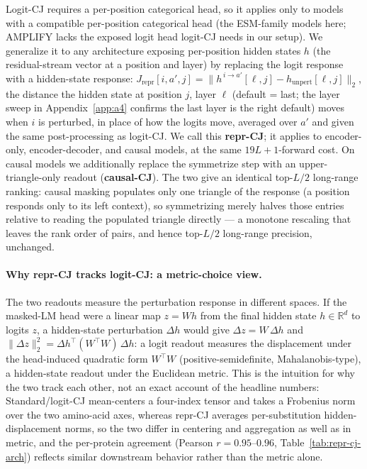 \documentclass{article}
\begin{document}
Logit-CJ requires a per-position categorical head, so it applies only
to models with a compatible per-position categorical head (the ESM-family
models here; AMPLIFY lacks the exposed logit head logit-CJ needs in our
setup). We generalize
it to any architecture exposing per-position hidden states $h$ (the
residual-stream vector at a position and layer) by replacing the logit
response with a hidden-state response:
$J_{\mathrm{repr}}[i, a', j] = \| h^{\,i\to a'}[\ell, j] - h_{\mathrm{unpert}}[\ell, j] \|_2$,
the distance the hidden state at position $j$, layer $\ell$
(default = last; the layer sweep in Appendix~\ref{app:a4} confirms the
last layer is the right default) moves when $i$ is perturbed, in place of
how the logits move, averaged over $a'$ and given the same post-processing
as logit-CJ. We call this \textbf{repr-CJ}; it
applies to encoder-only, encoder-decoder, and causal models, at the
same $19L+1$-forward cost. On causal models we additionally replace
the symmetrize step with an upper-triangle-only readout
(\textbf{causal-CJ}). The two give an identical top-$L/2$ long-range
ranking: causal masking populates only one triangle of the response
(a position responds only to its left context), so symmetrizing merely
halves those entries relative to reading the populated triangle
directly --- a monotone rescaling that leaves the rank order of pairs,
and hence top-$L/2$ long-range precision, unchanged.

\paragraph{Why repr-CJ tracks logit-CJ: a metric-choice view.}
The two readouts measure the perturbation response in different spaces.
If the masked-LM head were a linear map $z = Wh$ from the final hidden
state $h \in \mathbb{R}^{d}$ to logits $z$, a hidden-state perturbation
$\Delta h$ would give $\Delta z = W\,\Delta h$ and
$\|\Delta z\|_2^2 = \Delta h^\top (W^\top W)\, \Delta h$: a logit readout
measures the displacement under the head-induced quadratic form
$W^\top W$ (positive-semidefinite, Mahalanobis-type), a hidden-state
readout under the Euclidean metric. This is the intuition for why the
two track each other, not an exact account of the headline numbers:
Standard/logit-CJ mean-centers a four-index tensor and takes a Frobenius
norm over the two amino-acid axes, whereas repr-CJ averages
per-substitution hidden-displacement norms, so the two differ in
centering and aggregation as well as in metric, and the per-protein
agreement (Pearson $r = 0.95$--$0.96$, Table~\ref{tab:repr-cj-arch})
reflects similar downstream behavior rather than the metric alone.
\end{document}

